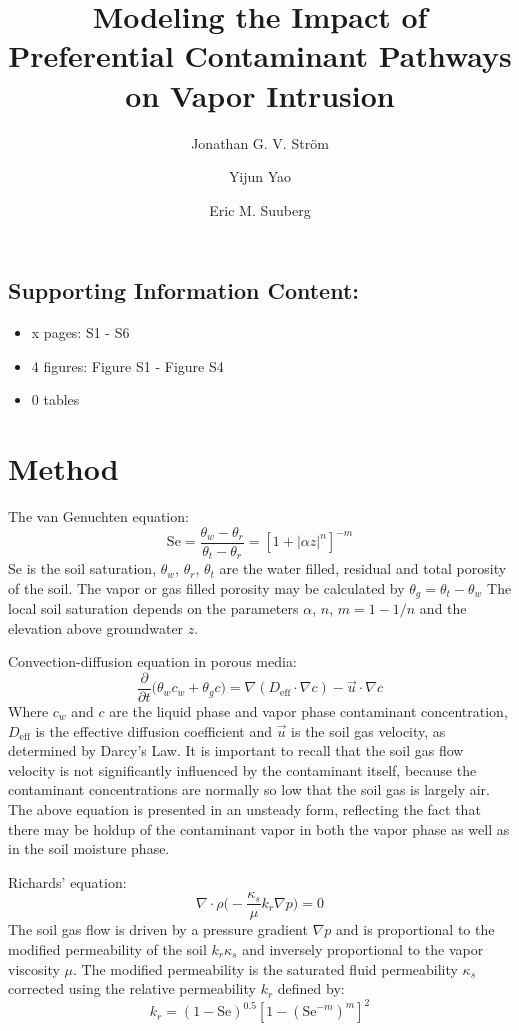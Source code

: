 \documentclass[journal=esthag,manuscript=suppinfo]{achemso}
\author{Jonathan G. V. Ström}
\affiliation[Brown University]{Brown University, School of Engineering}
\author{Yijun Yao}
\affiliation[Zhejiang University]{Zhejiang University}
\author{Eric M. Suuberg}
\affiliation[Brown University]{Brown University, School of Engineering}
\title{Modeling the Impact of Preferential Contaminant Pathways on Vapor Intrusion}
\begin{document}
\subsection{Supporting Information Content:}

\begin{itemize}
  \item x pages: S1 - S6
  \item 4 figures: Figure S1 - Figure S4
  \item 0 tables
\end{itemize}


\section{Method}
The van Genuchten equation\cite{Genuchten1980a}:
\begin{equation}
  \mathrm{Se} = \frac{\theta_w - \theta_r}{\theta_t - \theta_r} = [1 + |\alpha z|^n]^{-m} \label{eq:saturation}
\end{equation}
Se is the soil saturation, $\theta_w$, $\theta_r$, $\theta_t$ are the water filled, residual and total porosity of the soil.
The vapor or gas filled porosity may be calculated by $\theta_g = \theta_t - \theta_w$
The local soil saturation depends on the parameters $\alpha$, $n$, $m= 1 - 1/n$ and the elevation above groundwater $z$.

Convection-diffusion equation in porous media:
\begin{equation}
  \frac{\partial}{\partial t} \Big( \theta_w c_w + \theta_g c \Big) = \nabla (D_\mathrm{eff} \cdot \nabla c) - \vec{u} \cdot \nabla c \label{eq:conv-diff}
\end{equation}
Where $c_w$ and $c$ are the liquid phase and vapor phase contaminant concentration, $D_\mathrm{eff}$ is
the effective diffusion coefficient and $\vec{u}$ is the soil gas velocity, as determined by Darcy’s Law.
It is important to recall that the soil gas flow velocity is not significantly influenced by the contaminant itself, because the contaminant concentrations are normally so low that the soil gas is largely air.
The above equation is presented in an unsteady form, reflecting the fact that there may be holdup of the contaminant vapor in both the vapor phase as well as in the soil moisture phase. \par

Richards' equation\cite{Richards1931a}:
\begin{equation}
  \nabla \cdot \rho \Big( - \frac{\kappa_s}{\mu} k_r \nabla p \Big) = 0 \label{eq:richards-equation}
\end{equation}
The soil gas flow is driven by a pressure gradient $\nabla p$ and is proportional to the modified permeability of the soil $k_r \kappa_s$ and inversely proportional to the vapor viscosity $\mu$.
The modified permeability is the saturated fluid permeability $\kappa_s$ corrected using the relative permeability $k_r$ defined by:
\begin{equation}
  k_r = (1 - \mathrm{Se})^{0.5} [1 - (\mathrm{Se}^{-m})^m]^2 \label{eq:k_r}
\end{equation}
\end{document}
